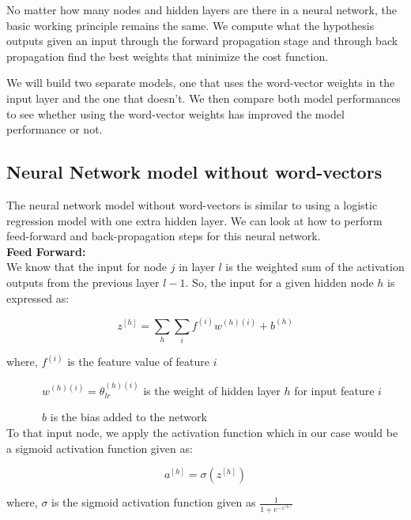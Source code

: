 No matter how many nodes and hidden layers are there in a neural network, the basic working principle remains the same. We compute what the hypothesis outputs given an input through the forward propagation stage and through back propagation find the best weights that minimize the cost function.

We will build two separate models, one that uses the word-vector weights in the input layer and the one that doesn't. We then compare both model performances to see whether using the word-vector weights has improved the model performance or not.

\subsection{Neural Network model without word-vectors}

The neural network model without word-vectors is similar to using a logistic regression model with one extra hidden layer. We can look at how to perform feed-forward and back-propagation steps for this neural network.\\

\noindent \textbf{Feed Forward:}\\

We know that the input for node $j$ in layer $l$ is the weighted sum of the activation outputs from the previous layer $l-1$. So, the input for a given hidden node $h$ is expressed as:

\begin{equation}
z^{[h]} = \sum_{h}\sum_{i} f^{(i)}w^{(h)(i)} + b^{(h)}
\end{equation}

where, $f^{(i)}$ is the feature value of feature $i$

$\quad\qquad\ w^{(h)(i)} = \theta_{lr}^{(h)(i)}$ is the weight of hidden layer $h$ for input feature $i$

$\quad\qquad\ b$ is the bias added to the network\\

To that input node, we apply the activation function which in our case would be a sigmoid activation function given as:

\begin{equation}
a^{[h]} = \sigma(z^{[h]})
\end{equation}

where, $\sigma$ is the sigmoid activation function given as $\frac{1}{1+e^{-z^[h]}}$\\

